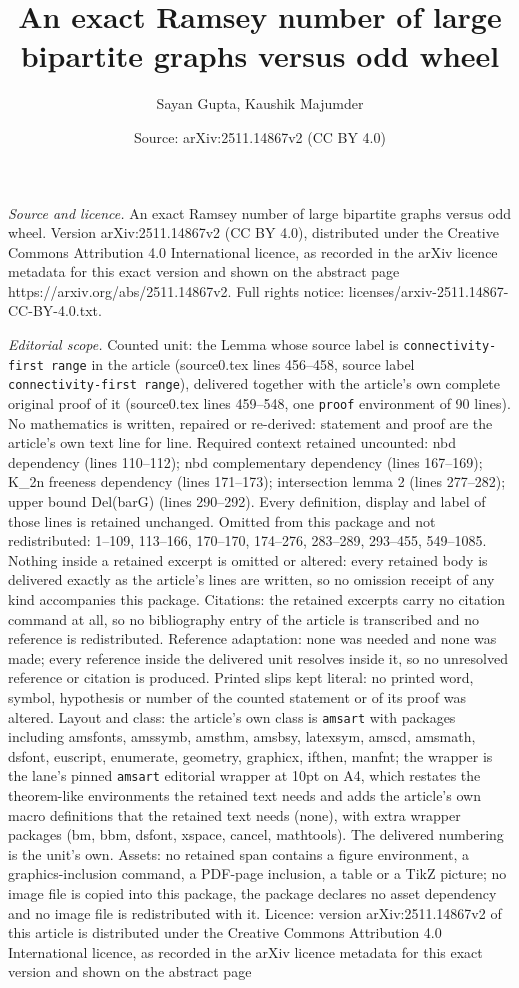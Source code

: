 \documentclass[10pt,a4paper]{amsart}
\title[An exact Ramsey number of large bipartite graphs versus odd ]{An exact Ramsey number of large bipartite graphs versus odd wheel}
\author{Sayan Gupta, Kaushik Majumder}
\date{Source: arXiv:2511.14867v2 (CC BY 4.0)}
\begin{document}
\maketitle

\noindent\emph{Source and licence.} An exact Ramsey number of large bipartite graphs versus odd wheel. Version arXiv:2511.14867v2 (CC BY 4.0), distributed under the Creative Commons Attribution 4.0 International licence, as recorded in the arXiv licence metadata for this exact version and shown on the abstract page https://arxiv.org/abs/2511.14867v2. Full rights notice: licenses/arxiv-2511.14867-CC-BY-4.0.txt.\par\smallskip

\noindent\textit{Editorial scope.} Counted unit: the Lemma whose source label is \texttt{connectivity-first range} in the article (source0.tex lines 456--458, source label \texttt{connectivity-first range}), delivered together with the article's own complete original proof of it (source0.tex lines 459--548, one \texttt{proof} environment of 90 lines). No mathematics is written, repaired or re-derived: statement and proof are the article's own text line for line. Required context retained uncounted: nbd dependency (lines 110--112); nbd complementary dependency (lines 167--169); K\_2n freeness dependency (lines 171--173); intersection lemma 2 (lines 277--282); upper bound Del(barG) (lines 290--292). Every definition, display and label of those lines is retained unchanged. Omitted from this package and not redistributed: 1--109, 113--166, 170--170, 174--276, 283--289, 293--455, 549--1085. Nothing inside a retained excerpt is omitted or altered: every retained body is delivered exactly as the article's lines are written, so no omission receipt of any kind accompanies this package. Citations: the retained excerpts carry no citation command at all, so no bibliography entry of the article is transcribed and no reference is redistributed. Reference adaptation: none was needed and none was made; every reference inside the delivered unit resolves inside it, so no unresolved reference or citation is produced. Printed slips kept literal: no printed word, symbol, hypothesis or number of the counted statement or of its proof was altered. Layout and class: the article's own class is \texttt{amsart} with packages including amsfonts, amssymb, amsthm, amsbsy, latexsym, amscd, amsmath, dsfont, euscript, enumerate, geometry, graphicx, ifthen, manfnt; the wrapper is the lane's pinned \texttt{amsart} editorial wrapper at 10pt on A4, which restates the theorem-like environments the retained text needs and adds the article's own macro definitions that the retained text needs (none), with extra wrapper packages (bm, bbm, dsfont, xspace, cancel, mathtools). The delivered numbering is the unit's own. Assets: no retained span contains a figure environment, a graphics-inclusion command, a PDF-page inclusion, a table or a TikZ picture; no image file is copied into this package, the package declares no asset dependency and no image file is redistributed with it. Licence: version arXiv:2511.14867v2 of this article is distributed under the Creative Commons Attribution 4.0 International licence, as recorded in the arXiv licence metadata for this exact version and shown on the abstract page 
\end{document}
